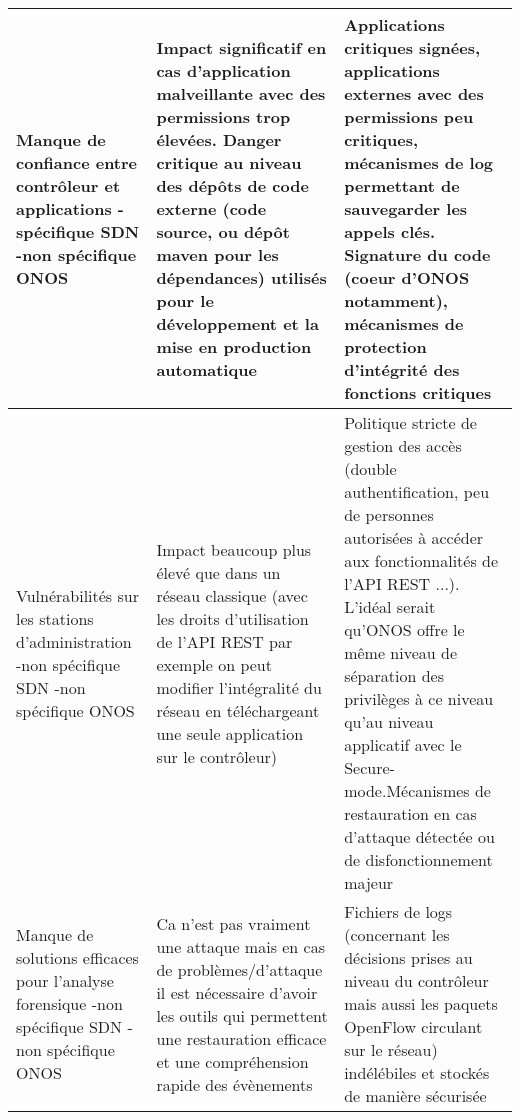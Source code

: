 \begin{small}
\begin{longtable}{| p{} | p{} | p{}|}
\hline
Manque de confiance entre contrôleur et applications \newline -spécifique SDN \newline -non spécifique ONOS & Impact significatif en cas d'application malveillante avec des permissions trop élevées. Danger critique au niveau des dépôts de code externe (code source, ou dépôt maven pour les dépendances) utilisés pour le développement et la mise en production automatique & Applications critiques signées, applications externes avec des permissions peu critiques, mécanismes de log permettant de sauvegarder les appels clés. Signature du code (coeur d'ONOS notamment), mécanismes de protection d'intégrité des fonctions critiques\\ 
\hline
Vulnérabilités sur les stations d'administration \newline -non spécifique SDN \newline -non spécifique ONOS & Impact beaucoup plus élevé que dans un réseau classique (avec les droits d'utilisation de l'API REST par exemple on peut modifier l'intégralité du réseau en téléchargeant une seule application sur le contrôleur) & Politique stricte de gestion des accès (double authentification, peu de personnes autorisées à accéder aux fonctionnalités de l'API REST ...). L'idéal serait qu'ONOS offre le même niveau de séparation des privilèges à ce niveau qu'au niveau applicatif avec le Secure-mode.\newline Mécanismes de restauration en cas d'attaque détectée ou de disfonctionnement majeur\\ 
\hline
Manque de solutions efficaces pour l'analyse forensique \newline -non spécifique SDN \newline -non spécifique ONOS & Ca n'est pas vraiment une attaque mais en cas de problèmes/d'attaque il est nécessaire d'avoir les outils qui permettent une restauration efficace et une compréhension rapide des évènements & Fichiers de logs (concernant les décisions prises au niveau du contrôleur mais aussi les paquets OpenFlow circulant sur le réseau) indélébiles et stockés de manière sécurisée\\ 
\hline

\end{longtable}

\end{small}

